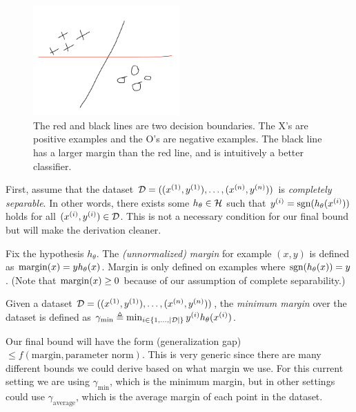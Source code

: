 \begin{figure}[h!]
    \begin{center}
  \includegraphics[width=0.5\textwidth]{figures/margin.png}
  \end{center}
  \caption{The red and black lines are two decision boundaries. The X's are positive examples and the O's are negative examples. The black line has a larger margin than the red line, and is intuitively a better classifier.}
  \label{lec6:fig:margin}
\end{figure}

First, assume that the dataset $\mathcal D = ((x^{(1)}, y^{(1)}), \dots, (x^{(n)}, y^{(n)}))$ is \textit{completely separable}. In other words, there exists some $h_\theta\in\mathcal H$ such that $y^{(i)} = \text{sgn}(h_\theta(x^{(i)}))$ holds for all $( x^{(i)},y^{(i)})\in \mathcal D$. This is not a necessary condition for our final bound but will make the derivation cleaner.

\begin{definition}
Fix the hypothesis $h_\theta$. The \textit{(unnormalized) margin} for example $(x, y)$ is defined as $\text{margin}(x) = yh_\theta(x)$. Margin is only defined on examples where $\text{sgn}(h_\theta(x)) = y$. (Note that $\text{margin}(x)\geq 0$ because of our assumption of complete separability.)
\end{definition}

\begin{definition} Given a dataset $\mathcal D = ((x^{(1)}, y^{(1)}), \dots, (x^{(n)}, y^{(n)}))$, the \textit{minimum margin} over the dataset is defined as $\gamma_{\min} \triangleq \min_{i\in\{1,\dots,|\mathcal D|\}} y^{(i)}h_\theta(x^{(i)})$.
\end{definition}

Our final bound will have the form (generalization gap)$\leq f(\text{margin},\text{parameter norm})$. This is very generic since there are many different bounds we could derive based on what margin we use. For this current setting we are using $\gamma_{\min}$, which is the minimum margin, but in other settings could use $\gamma_{\text{average}}$, which is the average margin of each point in the dataset.

